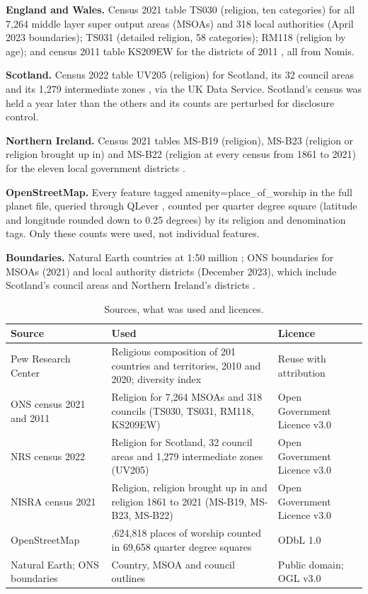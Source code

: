 \documentclass[11pt,a4paper]{article}
\begin{document}
\textbf{England and Wales.} Census 2021 table TS030 (religion, ten categories) for all 7,264 middle layer super output areas (MSOAs) and 318 local authorities (April 2023 boundaries); TS031 (detailed religion, 58 categories); RM118 (religion by age); and census 2011 table KS209EW for the districts of 2011 \citep{ons2021,ons2011}, all from Nomis.

\textbf{Scotland.} Census 2022 table UV205 (religion) for Scotland, its 32 council areas and its 1,279 intermediate zones \citep{nrs2022}, via the UK Data Service. Scotland's census was held a year later than the others and its counts are perturbed for disclosure control.

\textbf{Northern Ireland.} Census 2021 tables MS-B19 (religion), MS-B23 (religion or religion brought up in) and MS-B22 (religion at every census from 1861 to 2021) for the eleven local government districts \citep{nisra2021}.

\textbf{OpenStreetMap.} Every feature tagged amenity=place\_of\_worship in the full planet file, queried through QLever \citep{qlever}, counted per quarter degree square (latitude and longitude rounded down to 0.25 degrees) by its religion and denomination tags. Only these counts were used, not individual features.

\textbf{Boundaries.} Natural Earth countries at 1:50 million \citep{naturalearth}; ONS boundaries for MSOAs (2021) and local authority districts (December 2023), which include Scotland's council areas and Northern Ireland's districts \citep{onsgeo}.

\begin{table}[tbp]\centering\small\caption{Sources, what was used and licences.}\label{tab:sources}\begin{tabular}{>{\raggedright\arraybackslash}p{3.4cm}>{\raggedright\arraybackslash}p{7.2cm}>{\raggedright\arraybackslash}p{3.6cm}}\toprule Source & Used & Licence\\\midrule
Pew Research Center & Religious composition of 201 countries and territories, 2010 and 2020; diversity index & Reuse with attribution\\
ONS census 2021 and 2011 & Religion for 7,264 MSOAs and 318 councils (TS030, TS031, RM118, KS209EW) & Open Government Licence v3.0\\
NRS census 2022 & Religion for Scotland, 32 council areas and 1,279 intermediate zones (UV205) & Open Government Licence v3.0\\
NISRA census 2021 & Religion, religion brought up in and religion 1861 to 2021 (MS-B19, MS-B23, MS-B22) & Open Government Licence v3.0\\
OpenStreetMap & 1,624,818 places of worship counted in 69,658 quarter degree squares & ODbL 1.0\\
Natural Earth; ONS boundaries & Country, MSOA and council outlines & Public domain; OGL v3.0\\
\bottomrule\end{tabular}\end{table}
\end{document}
